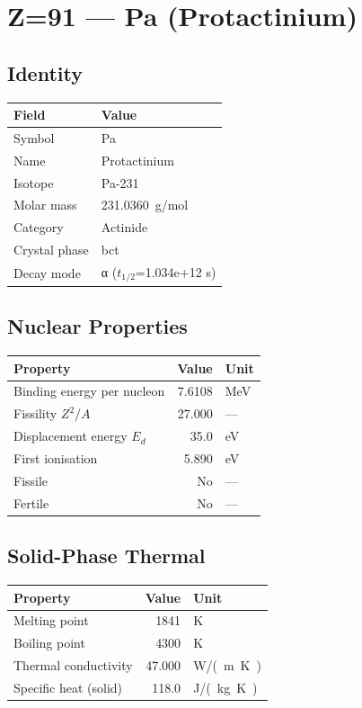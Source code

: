 \documentclass[11pt,a4paper]{article}
\begin{document}
\newpage

\section{Z=91 --- Pa (Protactinium)}
\label{sec:Z91}

\subsection{Identity}
\begin{tabular}{ll}
  \toprule
  Field & Value \\
  \midrule
  Symbol & Pa \\
  Name & Protactinium \\
  Isotope & Pa-231 \\
  Molar mass & \SI{231.0360}{g/mol} \\
  Category & Actinide \\
  Crystal phase & bct \\
  Decay mode & α ($t_{1/2}$=1.034e+12 s) \\
  \bottomrule
\end{tabular}

\subsection{Nuclear Properties}
\begin{tabular}{lrl}
  \toprule
  Property & Value & Unit \\
  \midrule
  Binding energy per nucleon & 7.6108 & \si{MeV} \\
  Fissility $Z^2/A$ & 27.000 & --- \\
  Displacement energy $E_d$ & 35.0 & \si{eV} \\
  First ionisation & 5.890 & \si{eV} \\
  Fissile & No & --- \\
  Fertile & No & --- \\
  \bottomrule
\end{tabular}

\subsection{Solid-Phase Thermal}
\begin{tabular}{lrl}
  \toprule
  Property & Value & Unit \\
  \midrule
  Melting point & 1841 & \si{K} \\
  Boiling point & 4300 & \si{K} \\
  Thermal conductivity & 47.000 & \si{W/(m.K)} \\
  Specific heat (solid) & 118.0 & \si{J/(kg.K)} \\
  \bottomrule
\end{tabular}
\end{document}
